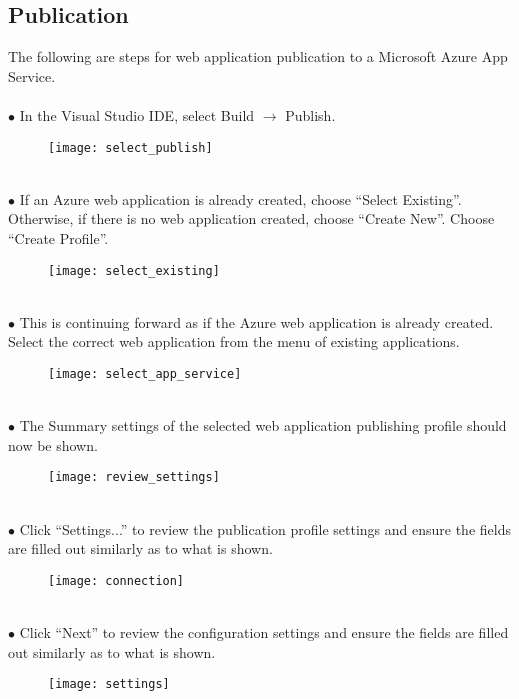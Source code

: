 \subsection{Publication}

\tab The following are steps for web application publication to a Microsoft Azure App Service.\\
    
    \ \\
    \tab $\bullet$ In the Visual Studio IDE, select Build $\rightarrow$ Publish.
    \begin{figure}[H] 
        \centering
        \texttt{[image: select\_publish]}
    \end{figure}
    
    \ \\
    \tab $\bullet$ If an Azure web application is already created, choose ``Select Existing''.  Otherwise, if there is no web application created, choose ``Create New''.  Choose ``Create Profile''.
    \begin{figure}[H] 
        \centering
        \texttt{[image: select\_existing]}
    \end{figure}
        
    \ \\
    \tab $\bullet$ This is continuing forward as if the Azure web application is already created. Select the correct web application from the menu of existing applications.
    \begin{figure}[H] 
        \centering
        \texttt{[image: select\_app\_service]}
    \end{figure}
        
    \ \\
    \tab $\bullet$ The Summary settings of the selected web application publishing profile should now be shown.
    \begin{figure}[H] 
        \centering
        \texttt{[image: review\_settings]}
    \end{figure}
    
    \ \\
    \tab $\bullet$ Click ``Settings...'' to review the publication profile settings and ensure the fields are filled out similarly as to what is shown.
    \begin{figure}[H] 
        \centering
        \texttt{[image: connection]}
    \end{figure}
    
    \ \\
    \tab $\bullet$ Click ``Next'' to review the configuration settings and ensure the fields are filled out similarly as to what is shown.
    \begin{figure}[H] 
        \centering
        \texttt{[image: settings]}
    \end{figure}
    
